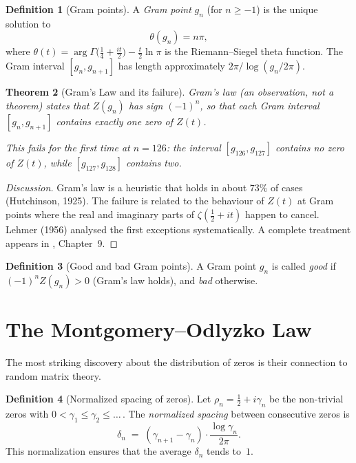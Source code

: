 \documentclass[12pt,a4paper]{amsart}
\newtheorem{theorem}{Theorem}[section]
\theoremstyle{definition}
\newtheorem{definition}[theorem]{Definition}
\begin{document}
\begin{definition}[Gram points]
\label{def:gram_points}
A \emph{Gram point} $g_n$ (for $n \ge -1$) is the unique solution to
\[
  \theta(g_n) = n\pi,
\]
where $\theta(t) = \arg\Gamma\!\bigl(\tfrac{1}{4}+\tfrac{it}{2}\bigr) - \tfrac{t}{2}\ln\pi$
is the Riemann--Siegel theta function.
The Gram interval $[g_n, g_{n+1}]$ has length approximately $2\pi/\log(g_n/2\pi)$.
\end{definition}

\begin{theorem}[Gram's Law and its failure]
\label{thm:gram}
\emph{Gram's law} (an observation, not a theorem) states that $Z(g_n)$
has sign $(-1)^n$, so that each Gram interval $[g_n, g_{n+1}]$ contains
exactly one zero of $Z(t)$.

This fails for the first time at $n = 126$: the interval $[g_{126}, g_{127}]$
contains no zero of $Z(t)$, while $[g_{127}, g_{128}]$ contains two.
\end{theorem}

\begin{proof}[Discussion]
Gram's law is a heuristic that holds in about $73\%$ of cases
(Hutchinson, 1925).  The failure is related to the behaviour of $Z(t)$ at
Gram points where the real and imaginary parts of $\zeta(\tfrac{1}{2}+it)$
happen to cancel.  Lehmer (1956) analysed the first exceptions systematically.
A complete treatment appears in \cite{Titchmarsh1986}, Chapter~9.
\end{proof}

\begin{definition}[Good and bad Gram points]
A Gram point $g_n$ is called \emph{good} if $(-1)^n Z(g_n) > 0$
(Gram's law holds), and \emph{bad} otherwise.
\end{definition}

\section{The Montgomery--Odlyzko Law}

The most striking discovery about the distribution of zeros is their
connection to random matrix theory.

\begin{definition}[Normalized spacing of zeros]
\label{def:spacing}
Let $\rho_n = \tfrac{1}{2} + i\gamma_n$ be the non-trivial zeros with
$0 < \gamma_1 \le \gamma_2 \le \ldots$\,.
The \emph{normalized spacing} between consecutive zeros is
\[
  \delta_n \;=\; (\gamma_{n+1} - \gamma_n) \cdot \frac{\log\gamma_n}{2\pi}.
\]
This normalization ensures that the average $\delta_n$ tends to~$1$.
\end{definition}
\end{document}
